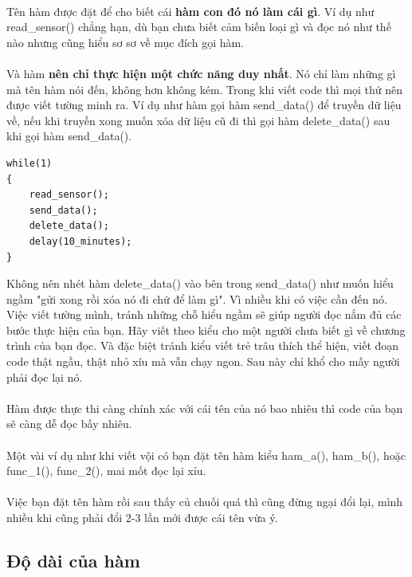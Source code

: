 \documentclass[12pt,a5paper]{book}
\begin{document}
\paragraph{}
Tên hàm được đặt để cho biết cái \textbf{hàm con đó nó làm cái gì}. Ví dụ như read\_sensor() chẳng hạn, dù bạn chưa biết cảm biến loại gì và đọc nó như thế nào nhưng cũng hiểu sơ sơ về mục đích gọi hàm.
\paragraph{}
Và hàm \textbf{nên chỉ thực hiện một chức năng duy nhất}. Nó chỉ làm những gì mà tên hàm nói đến, không hơn không kém. Trong khi viết code thì mọi thứ nên được viết tường minh ra. Ví dụ như hàm gọi hàm send\_data() để truyền dữ liệu về, nếu khi truyền xong muốn xóa dữ liệu cũ đi thì gọi hàm delete\_data() sau khi gọi hàm send\_data().
\begin{lstlisting}
while(1)
{
	read_sensor();
	send_data();
	delete_data();
	delay(10_minutes);
}
\end{lstlisting}
Không nên nhét hàm delete\_data() vào bên trong send\_data() như muốn hiểu ngầm "gửi xong rồi xóa nó đi chứ để làm gì". Vì nhiều khi có việc cần đến nó. Việc viết tường mình, tránh những chỗ hiểu ngầm sẽ giúp người đọc nắm đủ các bước thực hiện của bạn. Hãy viết theo kiểu cho một người chưa biết gì về chương trình của bạn đọc. Và đặc biệt tránh kiểu viết trẻ trâu thích thể hiện, viết đoạn code thật ngầu, thật nhỏ xíu mà vẫn chạy ngon. Sau này chỉ khổ cho mấy người phải đọc lại nó.
\paragraph{}
Hàm được thực thi càng chính xác với cái tên của nó bao nhiêu thì code của bạn sẽ càng dễ đọc bấy nhiêu. 
\paragraph{}
Một vài ví dụ như khi viết vội có bạn đặt tên hàm kiểu ham\_a(), ham\_b(), hoặc func\_1(), func\_2(), mai mốt đọc lại xỉu.
\paragraph{}
Việc bạn đặt tên hàm rồi sau thấy củ chuối quá thì cũng đừng ngại đổi lại, mình nhiều khi cũng phải đổi 2-3 lần mới được cái tên vừa ý.
\subsection{Độ dài của hàm}
\end{document}
